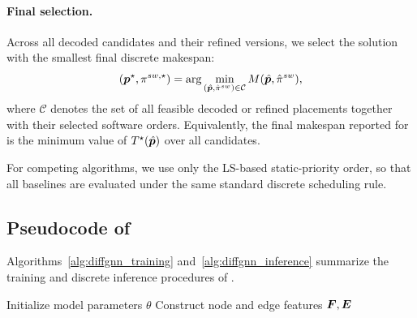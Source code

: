 \paragraph{\textbf{Final selection.}}
Across all decoded candidates and their refined versions, we select the solution with the smallest final discrete makespan:
\begin{equation}
({\bm{p}}^\star,\pi^{sw,\star})
=
\arg\min_{(\hat{{\bm{p}}},\hat{\pi}^{sw})\in\mathcal{C}}
M(\hat{{\bm{p}}},\hat{\pi}^{sw}),
\end{equation}
where $\mathcal{C}$ denotes the set of all feasible decoded or refined placements together with their selected software orders. Equivalently, the final makespan reported for \diffgnn is the minimum value of $T^\star(\hat{{\bm{p}}})$ over all candidates.

For competing algorithms, we use only the LS-based static-priority order, so that all baselines are evaluated under the same standard discrete scheduling rule.




\subsection{Pseudocode of \diffgnn}
Algorithms~\ref{alg:diffgnn_training} and~\ref{alg:diffgnn_inference} summarize the training and discrete inference procedures of \diffgnn.

\begin{algorithm}[!htbp]
\caption{Training of \diffgnn}
\label{alg:diffgnn_training}
Initialize model parameters $\theta$\;
Construct node and edge features ${\bm{F}},{\bm{E}}$\;

\end{algorithm}

